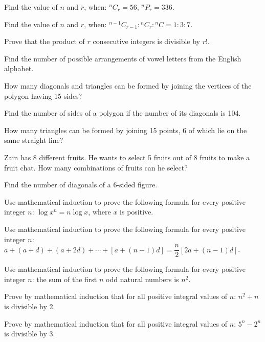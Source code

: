 \documentclass[11pt,a4paper]{article}
\begin{document}
\begin{shortlist}
\item Find the value of $n$ and $r$, when: ${}^nC_r=56$, ${}^nP_r=336$.

\item Find the value of $n$ and $r$, when: ${}^{n-1}C_{r-1}:{}^nC_r:{}^nC=1:3:7$.

\item Prove that the product of $r$ consecutive integers is divisible by $r!$.

\item Find the number of possible arrangements of vowel letters from the English alphabet.

\item How many diagonals and triangles can be formed by joining the vertices of the polygon having 15 sides?

\item Find the number of sides of a polygon if the number of its diagonals is 104.

\item How many triangles can be formed by joining 15 points, 6 of which lie on the same straight line?

\item Zain has 8 different fruits. He wants to select 5 fruits out of 8 fruits to make a fruit chat. How many combinations of fruits can he select?

\item Find the number of diagonals of a 6-sided figure.

\item Use mathematical induction to prove the following formula for every positive integer $n$: $\log x^n=n\log x$, where $x$ is positive.

\item Use mathematical induction to prove the following formula for every positive integer $n$: $a+(a+d)+(a+2d)+\cdots+[a+(n-1)d]=\dfrac{n}{2}[2a+(n-1)d]$.

\item Use mathematical induction to prove the following formula for every positive integer $n$: the sum of the first $n$ odd natural numbers is $n^2$.

\item Prove by mathematical induction that for all positive integral values of $n$: $n^2+n$ is divisible by 2.

\item Prove by mathematical induction that for all positive integral values of $n$: $5^n-2^n$ is divisible by 3.


\end{shortlist}
\end{document}

